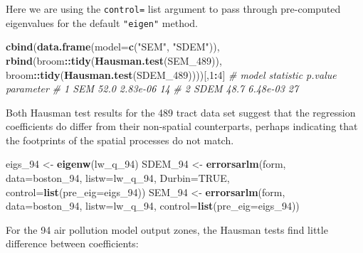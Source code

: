 \documentclass[]{book}
\newenvironment{Shaded}{\begin{snugshade}}{\end{snugshade}}
\newcommand{\CommentTok}[1]{\textcolor[rgb]{0.56,0.35,0.01}{\textit{#1}}}
\newcommand{\DataTypeTok}[1]{\textcolor[rgb]{0.13,0.29,0.53}{#1}}
\newcommand{\DecValTok}[1]{\textcolor[rgb]{0.00,0.00,0.81}{#1}}
\newcommand{\KeywordTok}[1]{\textcolor[rgb]{0.13,0.29,0.53}{\textbf{#1}}}
\newcommand{\NormalTok}[1]{#1}
\newcommand{\OperatorTok}[1]{\textcolor[rgb]{0.81,0.36,0.00}{\textbf{#1}}}
\newcommand{\OtherTok}[1]{\textcolor[rgb]{0.56,0.35,0.01}{#1}}
\newcommand{\StringTok}[1]{\textcolor[rgb]{0.31,0.60,0.02}{#1}}
\begin{document}
Here we are using the \texttt{control=} list argument to pass through pre-computed eigenvalues for the default \texttt{"eigen"} method.

\begin{Shaded}
\begin{Highlighting}[]
\KeywordTok{cbind}\NormalTok{(}\KeywordTok{data.frame}\NormalTok{(}\DataTypeTok{model=}\KeywordTok{c}\NormalTok{(}\StringTok{"SEM"}\NormalTok{, }\StringTok{"SDEM"}\NormalTok{)), }
      \KeywordTok{rbind}\NormalTok{(broom}\OperatorTok{::}\KeywordTok{tidy}\NormalTok{(}\KeywordTok{Hausman.test}\NormalTok{(SEM_}\DecValTok{489}\NormalTok{)), }
\NormalTok{            broom}\OperatorTok{::}\KeywordTok{tidy}\NormalTok{(}\KeywordTok{Hausman.test}\NormalTok{(SDEM_}\DecValTok{489}\NormalTok{))))[,}\DecValTok{1}\OperatorTok{:}\DecValTok{4}\NormalTok{]}
\CommentTok{#   model statistic  p.value parameter}
\CommentTok{# 1   SEM      52.0 2.83e-06        14}
\CommentTok{# 2  SDEM      48.7 6.48e-03        27}
\end{Highlighting}
\end{Shaded}

Both Hausman test results for the 489 tract data set suggest that the regression coefficients do differ from their non-spatial counterparts, perhaps indicating that the footprints of the spatial processes do not match.

\begin{Shaded}
\begin{Highlighting}[]
\NormalTok{eigs_}\DecValTok{94}\NormalTok{ <-}\StringTok{ }\KeywordTok{eigenw}\NormalTok{(lw_q_}\DecValTok{94}\NormalTok{)}
\NormalTok{SDEM_}\DecValTok{94}\NormalTok{ <-}\StringTok{ }\KeywordTok{errorsarlm}\NormalTok{(form, }\DataTypeTok{data=}\NormalTok{boston_}\DecValTok{94}\NormalTok{, }\DataTypeTok{listw=}\NormalTok{lw_q_}\DecValTok{94}\NormalTok{, }\DataTypeTok{Durbin=}\OtherTok{TRUE}\NormalTok{,}
                      \DataTypeTok{control=}\KeywordTok{list}\NormalTok{(}\DataTypeTok{pre_eig=}\NormalTok{eigs_}\DecValTok{94}\NormalTok{))}
\NormalTok{SEM_}\DecValTok{94}\NormalTok{ <-}\StringTok{ }\KeywordTok{errorsarlm}\NormalTok{(form, }\DataTypeTok{data=}\NormalTok{boston_}\DecValTok{94}\NormalTok{, }\DataTypeTok{listw=}\NormalTok{lw_q_}\DecValTok{94}\NormalTok{, }\DataTypeTok{control=}\KeywordTok{list}\NormalTok{(}\DataTypeTok{pre_eig=}\NormalTok{eigs_}\DecValTok{94}\NormalTok{))}
\end{Highlighting}
\end{Shaded}

For the 94 air pollution model output zones, the Hausman tests find little difference between coefficients:
\end{document}
